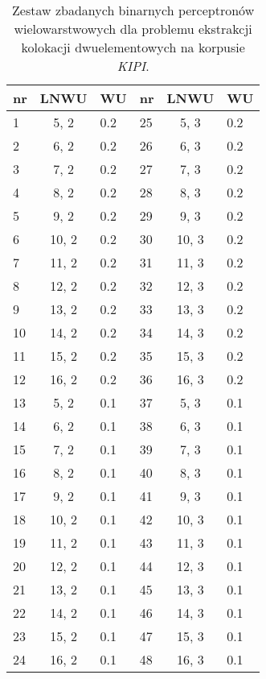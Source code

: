 \begin{table}[h!]
\centering
\footnotesize\setlength{\tabcolsep}{2.5pt}
\begin{tabular}{ l | c | l || l | c | l }
	\toprule
	\textbf{nr} 	& \textbf{LNWU}	& \textbf{WU}	& \textbf{nr}	& \textbf{LNWU}	& \textbf{WU}	\\
	\midrule
	1	&	5, 2	& 0.2	& 25	& 5, 3	& 0.2 \\
	2	&	6, 2	& 0.2	& 26	& 6, 3	& 0.2 \\
	3	&	7, 2	& 0.2	& 27	& 7, 3 	& 0.2 \\
	4	&	8, 2	& 0.2	& 28	& 8, 3	& 0.2 \\
	5	&	9, 2	& 0.2	& 29	& 9, 3	& 0.2 \\
	6	&	10, 2	& 0.2	& 30	& 10, 3	& 0.2 \\
	7	&	11, 2	& 0.2	& 31	& 11, 3	& 0.2 \\
	8	&	12, 2	& 0.2	& 32	& 12, 3	& 0.2 \\
	9	&	13, 2	& 0.2	& 33	& 13, 3	& 0.2 \\
	10	&	14, 2	& 0.2	& 34	& 14, 3	& 0.2 \\
	11	&	15, 2	& 0.2	& 35	& 15, 3	& 0.2 \\
	12	&	16, 2	& 0.2	& 36	& 16, 3	& 0.2 \\
	13	&	5, 2	& 0.1	& 37	& 5, 3	& 0.1 \\
	14	&	6, 2	& 0.1	& 38	& 6, 3	& 0.1 \\
	15	&	7, 2	& 0.1	& 39	& 7, 3	& 0.1 \\
	16	&	8, 2	& 0.1	& 40	& 8, 3	& 0.1 \\
	17	&	9, 2	& 0.1	& 41	& 9, 3	& 0.1 \\
	18	&	10, 2	& 0.1	& 42	& 10, 3	& 0.1 \\
	19	&	11, 2	& 0.1	& 43	& 11, 3	& 0.1 \\
	20	&	12, 2	& 0.1	& 44	& 12, 3	& 0.1 \\
	21	&	13, 2	& 0.1	& 45	& 13, 3	& 0.1 \\
	22	&	14, 2	& 0.1	& 46	& 14, 3	& 0.1 \\
	23	&	15, 2	& 0.1	& 47	& 15, 3	& 0.1 \\
	24	&	16, 2	& 0.1	& 48	& 16, 3	& 0.1 \\
	\bottomrule
\end{tabular}
\caption[Zestaw zbadanych binarnych perceptronów wielowarstwowych dla problemu ekstrakcji kolokacji dwuelementowych na korpusie \emph{KIPI}]{Zestaw zbadanych binarnych perceptronów wielowarstwowych dla problemu ekstrakcji kolokacji dwuelementowych na korpusie \emph{KIPI}.}
\label{KIPI_2_classifiers_set}
\end{table}


